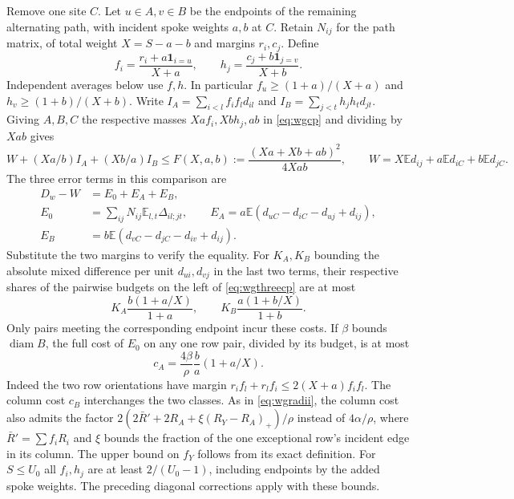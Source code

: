 \documentclass[11pt,a4paper]{article}
\theoremstyle{definition}
\begin{document}
Remove one site $C$. Let $u\in A,v\in B$ be the endpoints of the
remaining alternating path, with incident spoke weights $a,b$ at $C$.
Retain $N_{ij}$ for the path matrix, of total weight $X=S-a-b$ and
margins $r_i,c_j$. Define
\[
 f_i=\frac{r_i+a\mathbf1_{i=u}}{X+a},\qquad
 h_j=\frac{c_j+b\mathbf1_{j=v}}{X+b}.
\]
Independent averages below use $f,h$. In particular
$f_u\ge(1+a)/(X+a)$ and $h_v\ge(1+b)/(X+b)$.
Write $I_A=\sum_{i<l}f_if_l d_{il}$ and
$I_B=\sum_{j<t}h_jh_t d_{jt}$. Giving $A,B,C$ the respective masses
$Xaf_i,Xbh_j,ab$ in \eqref{eq:wgcp} and dividing by $Xab$ gives
\begin{equation}
 W+(Xa/b)I_A+(Xb/a)I_B\le
 F(X,a,b):=\frac{(Xa+Xb+ab)^2}{4Xab},\qquad
 W=X\mathbb Ed_{ij}+a\mathbb Ed_{iC}+b\mathbb Ed_{jC}.
 \label{eq:wgthreecp}
\end{equation}
The three error terms in this comparison are
\begin{align}
 D_w-W&=E_0+E_A+E_B,\nonumber\\
 E_0&=\sum_{ij}N_{ij}\mathbb E_{l,t}\Delta_{il;jt},\qquad
 E_A=a\mathbb E(d_{uC}-d_{iC}-d_{uj}+d_{ij}),\nonumber\\
 E_B&=b\mathbb E(d_{vC}-d_{jC}-d_{iv}+d_{ij}).
 \label{eq:wgerrors}
\end{align}
Substitute the two margins to verify the equality. For $K_A,K_B$
bounding the absolute mixed difference per unit $d_{ui},d_{vj}$ in
the last two terms, their respective shares of the pairwise budgets
on the left of \eqref{eq:wgthreecp} are at most
\begin{equation}
 K_A\frac{b(1+a/X)}{1+a},\qquad K_B\frac{a(1+b/X)}{1+b}.
 \label{eq:wgspokecharge}
\end{equation}
Only pairs meeting the corresponding endpoint incur these costs.
If $\beta$ bounds $\operatorname{diam}B$, the full cost of $E_0$
on any one row pair, divided by its budget, is at most
\begin{equation}
 c_A=\frac{4\beta}{\rho}\frac ba(1+a/X).
 \label{eq:wgmasscost}
\end{equation}
Indeed the two row orientations have margin $r_i f_l+r_l f_i\le
2(X+a)f_if_l$. The column cost $c_B$ interchanges the two classes.
As in \eqref{eq:wgradii}, the column cost also admits the factor
$2(2\bar R'+2R_A+\xi(R_Y-R_A)_+)/\rho$ instead of $4\alpha/\rho$,
where $\bar R'=\sum f_iR_i$ and $\xi$ bounds the fraction of the
one exceptional row's incident edge in its column. The upper bound on
$f_Y$ follows from its exact definition. For $S\le U_0$ all $f_i,h_j$
are at least $2/(U_0-1)$, including endpoints by the added spoke
weights. The preceding diagonal corrections apply with these bounds.
\end{document}
